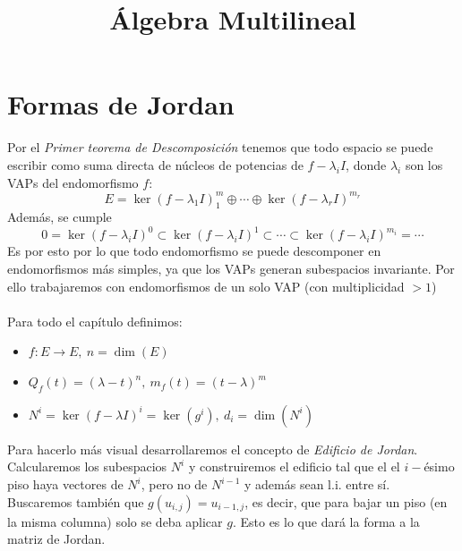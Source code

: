 \documentclass[leqno]{article}
\title{Álgebra Multilineal}
\begin{document}
\maketitle
\tableofcontents
\newpage

\section{Formas de Jordan}
Por el \textit{Primer teorema de Descomposición} tenemos que todo espacio se puede escribir como suma directa de núcleos de potencias de $f-\lambda_iI$, donde $\lambda_i$ son los VAPs del endomorfismo $f$:
$$
E = \ker(f-\lambda_1I)^m_1 \oplus \cdots \oplus \ker(f-\lambda_rI)^{m_r}
$$
Además, se cumple
$$
0 = \ker(f-\lambda_iI)^0\subset \ker(f-\lambda_iI)^1 \subset \cdots \subset \ker(f-\lambda_iI)^{m_i}=\cdots
$$
Es por esto por lo que todo endomorfismo se puede descomponer en endomorfismos más simples, ya que los VAPs generan subespacios invariante. Por ello trabajaremos con endomorfismos de un solo VAP (con multiplicidad $>1$) \\
\\
Para todo el capítulo definimos:
\begin{itemize}
    \item $f:E\to E,\ n = \dim (E)$
    \item $Q_f(t) = (\lambda - t)^n,\ m_f(t) = (t-\lambda)^m$
    \item $N^i = \ker(f-\lambda I)^i = \ker(g^i),\ d_i = \dim(N^i)$
\end{itemize}
Para hacerlo más visual desarrollaremos el concepto de \textit{Edificio de Jordan}. Calcularemos los subespacios $N^i$ y construiremos el edificio tal que el el $i-$ésimo piso haya vectores de $N^i$, pero no de $N^{i-1}$ y además sean l.i. entre sí. Buscaremos también que $g(u_{i,j})=u_{i-1, j}$, es decir, que para bajar un piso (en la misma columna) solo se deba aplicar $g$. Esto es lo que dará la forma a la matriz de Jordan.
\end{document}
